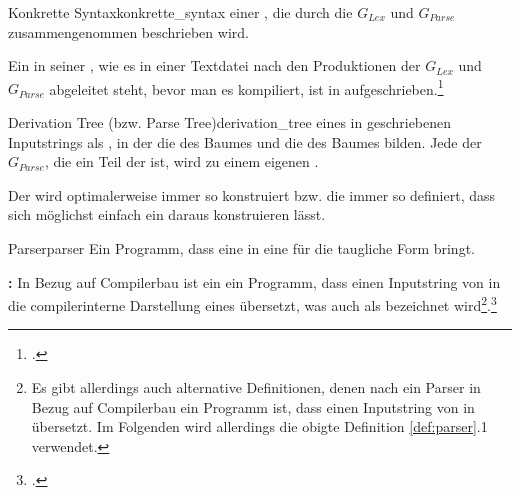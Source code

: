 \begin{Definition}{Konkrette Syntax}{konkrette_syntax}
   einer , die durch die  $G_{Lex}$ und $G_{Parse}$ zusammengenommen beschrieben wird.

  Ein  in seiner , wie es in einer Textdatei nach den Produktionen der  $G_{Lex}$ und $G_{Parse}$ abgeleitet steht, bevor man es kompiliert, ist in  aufgeschrieben.\footcite{noauthor_course_2022}
\end{Definition}

\begin{Definition}{Derivation Tree (bzw. Parse Tree)}{derivation_tree}
   eines in  geschriebenen Inputstrings als , in der  die  des Baumes und  die  des Baumes bilden. Jede  der  $G_{Parse}$, die ein Teil der  ist,  wird zu einem eigenen .

  Der  wird optimalerweise immer so konstruiert bzw. die  immer so definiert, dass sich möglichst einfach ein  daraus konstruieren lässt.


\end{Definition}

\begin{Definition}{Parser}{parser}
  Ein Programm, dass eine  in eine für die  taugliche Form bringt.

  {\normalfont\bfseries {}:\:\ignorespaces}
  In Bezug auf Compilerbau ist ein  ein Programm, dass einen Inputstring von  in die compilerinterne Darstellung eines  übersetzt, was auch als   bezeichnet wird\footnote{Es gibt allerdings auch alternative Definitionen, denen nach ein Parser in Bezug auf Compilerbau ein Programm ist, dass einen Inputstring von  in   übersetzt. Im Folgenden wird allerdings die obigte Definition \ref{def:parser}{.1} verwendet.}.\footcite{noauthor_compiler_nodate}
\end{Definition}

